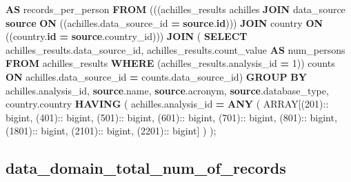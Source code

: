 \documentclass[
]{book}
\newenvironment{Shaded}{\begin{snugshade}}{\end{snugshade}}
\newcommand{\DataTypeTok}[1]{\textcolor[rgb]{0.13,0.29,0.53}{#1}}
\newcommand{\DecValTok}[1]{\textcolor[rgb]{0.00,0.00,0.81}{#1}}
\newcommand{\KeywordTok}[1]{\textcolor[rgb]{0.13,0.29,0.53}{\textbf{#1}}}
\newcommand{\NormalTok}[1]{#1}
\newcommand{\OperatorTok}[1]{\textcolor[rgb]{0.81,0.36,0.00}{\textbf{#1}}}
\begin{document}
\begin{Shaded}
\begin{Highlighting}[]
     \KeywordTok{AS}\NormalTok{ records\_per\_person}
  \KeywordTok{FROM}\NormalTok{ (((achilles\_results achilles}
    \KeywordTok{JOIN}\NormalTok{ data\_source }\KeywordTok{source}
      \KeywordTok{ON}\NormalTok{ ((achilles.data\_source\_id }\OperatorTok{=} \KeywordTok{source}\NormalTok{.}\KeywordTok{id}\NormalTok{)))}
    \KeywordTok{JOIN}\NormalTok{ country }\KeywordTok{ON}\NormalTok{ ((country.}\KeywordTok{id} \OperatorTok{=} \KeywordTok{source}\NormalTok{.country\_id)))}
    \KeywordTok{JOIN}\NormalTok{ ( }\KeywordTok{SELECT}\NormalTok{ achilles\_results.data\_source\_id,}
\NormalTok{           achilles\_results.count\_value }\KeywordTok{AS}\NormalTok{ num\_persons}
          \KeywordTok{FROM}\NormalTok{ achilles\_results}
         \KeywordTok{WHERE}\NormalTok{ (achilles\_results.analysis\_id }\OperatorTok{=} \DecValTok{1}\NormalTok{)) counts}
           \KeywordTok{ON}\NormalTok{ achilles.data\_source\_id }\OperatorTok{=}\NormalTok{ counts.data\_source\_id)}
 \KeywordTok{GROUP} \KeywordTok{BY}
\NormalTok{   achilles.analysis\_id,}
   \KeywordTok{source}\NormalTok{.name,}
   \KeywordTok{source}\NormalTok{.acronym,}
   \KeywordTok{source}\NormalTok{.database\_type,}
\NormalTok{   country.country}
\KeywordTok{HAVING}
\NormalTok{  (}
\NormalTok{    achilles.analysis\_id }\OperatorTok{=} \KeywordTok{ANY}\NormalTok{ (}
      \DataTypeTok{ARRAY}\NormalTok{[(}\DecValTok{201}\NormalTok{):: bigint,}
\NormalTok{      (}\DecValTok{401}\NormalTok{):: bigint,}
\NormalTok{      (}\DecValTok{501}\NormalTok{):: bigint,}
\NormalTok{      (}\DecValTok{601}\NormalTok{):: bigint,}
\NormalTok{      (}\DecValTok{701}\NormalTok{):: bigint,}
\NormalTok{      (}\DecValTok{801}\NormalTok{):: bigint,}
\NormalTok{      (}\DecValTok{1801}\NormalTok{):: bigint,}
\NormalTok{      (}\DecValTok{2101}\NormalTok{):: bigint,}
\NormalTok{      (}\DecValTok{2201}\NormalTok{):: bigint]}
\NormalTok{    )}
\NormalTok{  );}
\end{Highlighting}
\end{Shaded}

\hypertarget{data_domain_total_num_of_records}{%
\subsection*{data\_domain\_total\_num\_of\_records}\label{data_domain_total_num_of_records}}
\end{document}

